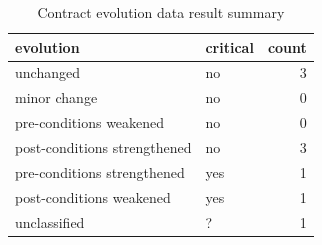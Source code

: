 \begin{table}[]
\centering
\caption{Contract evolution data result summary}
\label{tab:results-evolution}
\begin{tabular}{|l|l|r|} \hline
   evolution & critical & count \\ \hline
   unchanged & no & 3  \\
   minor change & no & 0  \\
   pre-conditions weakened & no & 0  \\
   post-conditions strengthened & no & 3  \\ \hline
   pre-conditions strengthened & yes & 1  \\
   post-conditions weakened & yes & 1  \\ \hline
   unclassified & ? & 1  \\ \hline
\end{tabular}
\end{table}
